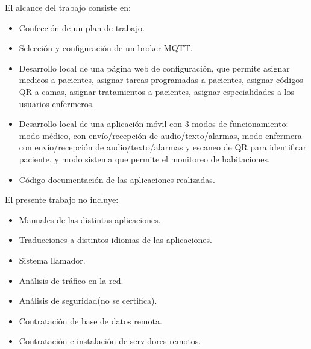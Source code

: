 \pagebreak
El alcance del trabajo consiste en:
\begin{itemize}
\item Confección de un plan de trabajo.
\item Selección y configuración de un broker MQTT.
\item Desarrollo local de una página web de configuración, que permite asignar medicos a pacientes, asignar tareas programadas a pacientes, asignar códigos QR a camas, asignar tratamientos a pacientes, asignar especialidades a los usuarios enfermeros.
\item Desarrollo local de una aplicación móvil con 3 modos de funcionamiento: modo médico, con envío/recepción de audio/texto/alarmas, modo enfermera con envío/recepción de audio/texto/alarmas y escaneo de QR para identificar paciente, y modo sistema que permite el monitoreo de habitaciones.
\item Código documentación de las aplicaciones realizadas.
\end{itemize}

El presente trabajo no incluye:
\begin{itemize}
\item Manuales de las distintas aplicaciones.
\item Traducciones a distintos idiomas de las aplicaciones.
\item Sistema llamador.
\item Análisis de tráfico en la red.
\item Análisis de seguridad(no se certifica).
\item Contratación de base de datos remota.
\item Contratación e instalación de servidores remotos.
\end{itemize}









